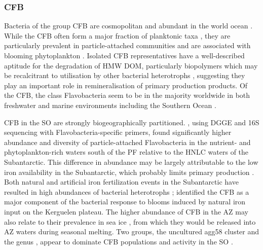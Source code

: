 \subsubsection{CFB}

Bacteria of the group \ac{CFB} are cosmopolitan and abundant in the world ocean \cite{Glockner:1999vm}.
While the \ac{CFB} often form a major fraction of planktonic taxa \cite{Fandino:2001uw}, they are particularly prevalent in particle-attached communities \cite{DeLong:1993uu} and are associated with blooming phytoplankton \cite{Pinhassi:2004is}.
Isolated \ac{CFB} representatives have a well-described aptitude for the degradation of \ac{HMW} \ac{DOM}, particularly biopolymers which may be recalcitrant to utilisation by other bacterial heterotrophs \citep[reviewed in][]{Kirchman:2002ub}, suggesting they play an important role in remineralisation of primary production products.
Of the \ac{CFB}, the class Flavobacteria seem to be in the majority worldwide in both freshwater and marine environments \cite{OSullivan:2006km,Cottrell:2005bo} including the Southern Ocean \cite{Abell:2005ji}.

\ac{CFB} in the \ac{SO} are strongly biogeographically partitioned.
\citet{Abell:2005ji}, using \ac{DGGE} and 16S sequencing with Flavobacteria-specific primers, found significantly higher abundance and diversity of particle-attached Flavobacteria in the nutrient- and phytoplankton-rich waters south of the \ac{PF} relative to the \ac{HNLC} waters of the Subantarctic.
This difference in abundance may be largely attributable to the low iron availability in the Subantarctic, which probably limits primary production \cite{Boyd:2007ij}.
Both natural and artificial iron fertilization events in the Subantarctic have resulted in high abundances of bacterial heterotrophs \cite{Christaki:2008el,Oliver:2004ty}; \citet{West:2008kc} identified the \ac{CFB} as a major component of the bacterial response to blooms induced by natural iron input on the Kerguelen plateau.
The higher abundance of \ac{CFB} in the \ac{AZ} may also relate to their prevalence in sea ice \cite{Brinkmeyer:2003iq,Brown:2001hh}, from which they would be released into \ac{AZ} waters during seasonal melting.
Two groups, the uncultured agg58 cluster and the genus , appear to dominate \ac{CFB} populations and activity in the \ac{SO} \cite{Murray:2007db,Abell:2005dh,Abell:2005ji,Obernosterer:2011df,West:2008kc,Ghiglione:2011ee,Ducklow:2011jl,Straza:2010io}.

